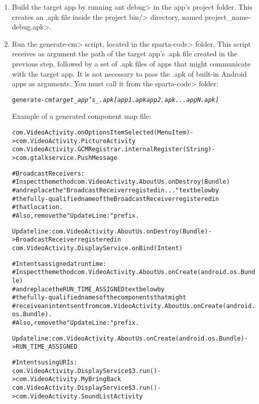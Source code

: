 \begin{enumerate}

\item
Build the target app by running \<ant debug> in the app's project folder. This
creates an .apk file inside the project \<bin/> directory, named
\<project\_name-debug.apk>.

\item
Run the \<generate-cm> script, located in the \<sparta-code> folder. This
script receives as argument the path of the target app's .apk file created in
the previous step,
followed by a set of .apk files of apps that might communicate with the target
app. It is not necessary to pass the .apk of built-in Android apps as arguments.
You must call it from the \<sparta-code> folder:
\bigskip

\begin{alltt}
generate-cm \textit{target\_app's\_.apk} \textit{[app1.apk app2.apk ... appN.apk]}
\end{alltt}

\bigskip

Example of a generated component map file:
\bigskip

\begin{alltt}
com.VideoActivity.onOptionsItemSelected(MenuItem) -> com.VideoActivity.PictureActivity
com.VideoActivity.GCMRegistrar.internalRegister(String) -> com.gtalkservice.PushMessage

#Broadcast Receivers:
#Inspect the method com.VideoActivity.AboutUs.onDestroy(Bundle)
#and replace the "BroadcastReceiver registed in..." text below by
#the fully-qualified name of the BroadcastReceiver registered in
#that location. 
#Also, remove the "Update Line: " prefix.

Update line: com.VideoActivity.AboutUs.onDestroy(Bundle) -> BroadcastReceiver registered in
                                com.VideoActivity.DisplayService.onBind(Intent)

#Intents assigned at run time:
#Inspect the method com.VideoActivity.AboutUs.onCreate(android.os.Bundle)
#and replace the RUN_TIME_ASSIGNED text below by 
#the fully-qualified names of the components that might 
#receive an intent sent from com.VideoActivity.AboutUs.onCreate(android.os.Bundle). 
#Also, remove the "Update Line: " prefix.

Update line: com.VideoActivity.AboutUs.onCreate(android.os.Bundle) -> RUN_TIME_ASSIGNED

#Intents using URIs:
com.VideoActivity.DisplayService\$3.run() -> com.VideoActivity.MyBringBack
com.VideoActivity.DisplayService\$3.run() -> com.VideoActivity.SoundListActivity


\end{alltt}
\end{enumerate}
